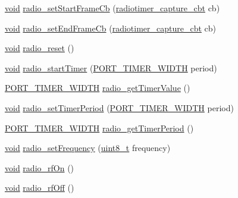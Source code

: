 \begin{DoxyCompactItemize}
\item 
\hyperlink{usb__devapi_8h_afabf60e7f57651d6d595a02c75f07cd0}{void} \hyperlink{group__radio_ga7efe6846c7583e300a67ef3a336c187c}{radio\+\_\+set\+Start\+Frame\+Cb} (\hyperlink{group__radiotimer_gac7da641d0774aa21bfabefd560e42acf}{radiotimer\+\_\+capture\+\_\+cbt} cb)
\item 
\hyperlink{usb__devapi_8h_afabf60e7f57651d6d595a02c75f07cd0}{void} \hyperlink{group__radio_gabb885551de090c751381377762ae3c7c}{radio\+\_\+set\+End\+Frame\+Cb} (\hyperlink{group__radiotimer_gac7da641d0774aa21bfabefd560e42acf}{radiotimer\+\_\+capture\+\_\+cbt} cb)
\item 
\hyperlink{usb__devapi_8h_afabf60e7f57651d6d595a02c75f07cd0}{void} \hyperlink{group__radio_gaf181029cf06b94f0f4ceaafec1c3f209}{radio\+\_\+reset} ()
\item 
\hyperlink{usb__devapi_8h_afabf60e7f57651d6d595a02c75f07cd0}{void} \hyperlink{group__radio_ga03e630aa7be3394bc7e0607dc85d50c8}{radio\+\_\+start\+Timer} (\hyperlink{z1_2board__info_8h_abe66b9c1c60db84f2a99f2b827275f24}{P\+O\+R\+T\+\_\+\+T\+I\+M\+E\+R\+\_\+\+W\+I\+D\+TH} period)
\item 
\hyperlink{z1_2board__info_8h_abe66b9c1c60db84f2a99f2b827275f24}{P\+O\+R\+T\+\_\+\+T\+I\+M\+E\+R\+\_\+\+W\+I\+D\+TH} \hyperlink{group__radio_ga9d6377834514a8ebf0b5987bb15daa2e}{radio\+\_\+get\+Timer\+Value} ()
\item 
\hyperlink{usb__devapi_8h_afabf60e7f57651d6d595a02c75f07cd0}{void} \hyperlink{group__radio_gaef86051d9ade0d9bd75070237447f83c}{radio\+\_\+set\+Timer\+Period} (\hyperlink{z1_2board__info_8h_abe66b9c1c60db84f2a99f2b827275f24}{P\+O\+R\+T\+\_\+\+T\+I\+M\+E\+R\+\_\+\+W\+I\+D\+TH} period)
\item 
\hyperlink{z1_2board__info_8h_abe66b9c1c60db84f2a99f2b827275f24}{P\+O\+R\+T\+\_\+\+T\+I\+M\+E\+R\+\_\+\+W\+I\+D\+TH} \hyperlink{group__radio_ga7845450951762209c4879ad10bf160e6}{radio\+\_\+get\+Timer\+Period} ()
\item 
\hyperlink{usb__devapi_8h_afabf60e7f57651d6d595a02c75f07cd0}{void} \hyperlink{group__radio_gaa062a57421da7b960a2613e4f65d3a11}{radio\+\_\+set\+Frequency} (\hyperlink{_p_e___types_8h_aba7bc1797add20fe3efdf37ced1182c5}{uint8\+\_\+t} frequency)
\item 
\hyperlink{usb__devapi_8h_afabf60e7f57651d6d595a02c75f07cd0}{void} \hyperlink{group__radio_gac01e153ff02faec0d39efa095d6e5837}{radio\+\_\+rf\+On} ()
\item 
\hyperlink{usb__devapi_8h_afabf60e7f57651d6d595a02c75f07cd0}{void} \hyperlink{group__radio_gaebe8cf9401340cd8bfaabfb8e465a0e9}{radio\+\_\+rf\+Off} ()

\end{DoxyCompactItemize}
